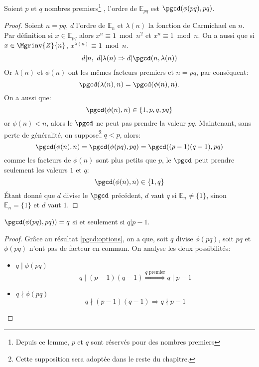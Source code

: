 		\begin{lemma}{Soient $p$ et $q$ nombres premiers\footnote{Depuis ce lemme, $p$ et $q$ sont réservés pour des nombres premiers}
		, l'ordre de $\mathbb{E}_{pq}$ est $\pgcd( \phi(pq) ,pq)$.}
			\begin{proof}
			Soient $n = pq$, $d$ l'ordre de $\mathbb{E}_n$ et $\lambda(n)$ la fonction de Carmichael en $n$. 
			Par définition si $x \in \mathbb{E}_{pq}$ alors $x^n \equiv 1 \bmod{n^2}$ et $x^n \equiv 1 \bmod{n}$. On a aussi que 
			si $x\in \Mgrinv{Z}{n}$, $x^{\lambda(n)} \equiv 1\bmod{n}$.
			\begin{align}
			d | n,~ d | \lambda(n) \Rightarrow d | \pgcd(n,\lambda(n))
			\end{align}
			Or $\lambda(n)$ et $\phi(n)$ ont les mêmes facteurs premiers et $n = pq$, par conséquent:  
			$$\pgcd(\lambda(n),n) = \pgcd(\phi(n),n).$$ On a aussi que:
			$$\pgcd(\phi(n),n) \in \{1,p,q,pq\}$$ or $\phi(n) < n$, alors le $\pgcd$ ne peut pas prendre la valeur $pq$. Maintenant, 
			sans perte de généralité, on suppose\footnote{Cette supposition sera adoptée dans le 
				reste du chapitre.} $q < p$, alors: 
				$$ \pgcd(\phi(n),n) = \pgcd(\phi(pq),pq) = \pgcd((p-1)(q-1),pq) $$
				comme les facteurs de $\phi(n)$ sont plus petits que $p$, le $\pgcd$ peut prendre
				seulement les valeurs $1$ et $q$:
				\begin{equation}
					\pgcd(\phi(n),n) \in \{1,q\} \label{pgcd:options}
				\end{equation}
			Étant donné que $d$ divise le $\pgcd$ précédent, $d$ vaut $q$ si $\mathbb{E}_n \neq \{1\}$, 
			sinon $\mathbb{E}_n = \{1\}$ et $d$ vaut $1$.
			\end{proof}
		\end{lemma}
		
		\begin{lemma}{$\pgcd(\phi(pq),pq)) = q$ si et seulement si $q|p-1$.}
			\begin{proof}
				Grâce au résultat \ref{pgcd:options}, on a que, soit $q$ divise $\phi(pq)$, soit $pq$ et $\phi(pq)$ n'ont pas de facteur en commun.
				On analyse les deux possibilités:
				\begin{itemize}
					\item  $q\mid\phi(pq)$
						$$ q \mid (p-1)(q-1) \stackrel{q\text{ premier}}{\Rightarrow} q \mid p-1$$
					\item  $q\nmid \phi(pq)$ 
						$$ q \nmid (p-1) (q-1) \Rightarrow q \nmid p-1 $$
				\end{itemize}
			\end{proof}
		\end{lemma}

